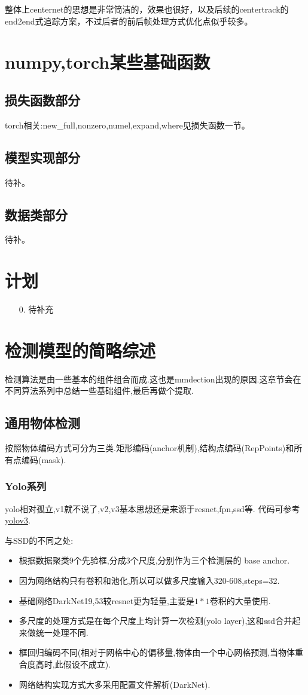 \documentclass[UTF8]{ctexart}
\begin{document}
整体上centernet的思想是非常简洁的，效果也很好，以及后续的centertrack的end2end式追踪方案，不过后者的前后帧处理方式优化点似乎较多。
\section{numpy,torch某些基础函数}
\label{sec:basefunc}
\subsection{损失函数部分}
torch相关:new\_full,nonzero,numel,expand,where见损失函数一节。
\subsection{模型实现部分}
待补。
\subsection{数据类部分}
待补。

\section{计划}
\begin{itemize}
	\item [0.]  待补充
\end{itemize}

\section{检测模型的简略综述}
检测算法是由一些基本的组件组合而成.这也是mmdection出现的原因.这章节会在不同算法系列中总结一些基础组件,最后再做个提取.
\subsection{通用物体检测}
按照物体编码方式可分为三类.矩形编码(anchor机制),结构点编码(RepPoints)和所有点编码(mask).
\subsubsection{Yolo系列}
yolo相对孤立,v1就不说了,v2,v3基本思想还是来源于resnet,fpn,ssd等.
代码可参考 \href{https://github.com/ultralytics/yolov3}{yolov3}.

与SSD的不同之处:
\begin{itemize}
	\item 根据数据聚类9个先验框,分成3个尺度,分别作为三个检测层的 base anchor.
	\item 因为网络结构只有卷积和池化,所以可以做多尺度输入320-608,steps=32.
	\item 基础网络DarkNet19,53较resnet更为轻量,主要是$1*1$卷积的大量使用.
	\item 多尺度的处理方式是在每个尺度上均计算一次检测(yolo layer),这和ssd合并起来做统一处理不同.
	\item 框回归编码不同(相对于网格中心的偏移量,物体由一个中心网格预测,当物体重合度高时,此假设不成立).
	\item 网络结构实现方式大多采用配置文件解析(DarkNet).
\end{itemize}
\end{document}
